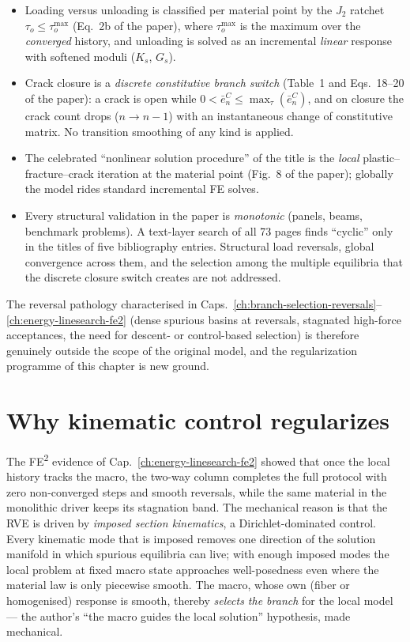\begin{itemize}
  \item Loading versus unloading is classified per material point by
        the $J_2$ ratchet $\tau_o \le \tau_o^{\max}$ (Eq.~2b of the
        paper), where $\tau_o^{\max}$ is the maximum over the
        \emph{converged} history, and unloading is solved as an
        incremental \emph{linear} response with softened moduli
        ($K_s$, $G_s$).
  \item Crack closure is a \emph{discrete constitutive branch switch}
        (Table~1 and Eqs.~18--20 of the paper): a crack is open while
        $0 < \bar e^{C}_n \le \max_{\tau}(\bar e^{C}_n)$, and on
        closure the crack count drops ($n \to n-1$) with an
        instantaneous change of constitutive matrix. No transition
        smoothing of any kind is applied.
  \item The celebrated ``nonlinear solution procedure'' of the title
        is the \emph{local} plastic--fracture--crack iteration at the
        material point (Fig.~8 of the paper); globally the model rides
        standard incremental FE solves.
  \item Every structural validation in the paper is \emph{monotonic}
        (panels, beams, benchmark problems). A text-layer search of all
        73 pages finds ``cyclic'' only in the titles of five
        bibliography entries. Structural load reversals, global
        convergence across them, and the selection among the multiple
        equilibria that the discrete closure switch creates are not
        addressed.
\end{itemize}

The reversal pathology characterised in
Caps.~\ref{ch:branch-selection-reversals}--\ref{ch:energy-linesearch-fe2}
(dense spurious basins at reversals, stagnated high-force acceptances,
the need for descent- or control-based selection) is therefore genuinely
outside the scope of the original model, and the regularization
programme of this chapter is new ground.

\section{Why kinematic control regularizes}
\label{sec:kb-control}

The FE\textsuperscript{2} evidence of
Cap.~\ref{ch:energy-linesearch-fe2} showed that once the local history
tracks the macro, the two-way column completes the full protocol with
zero non-converged steps and smooth reversals, while the same material
in the monolithic driver keeps its stagnation band. The mechanical
reason is that the RVE is driven by \emph{imposed section kinematics},
a Dirichlet-dominated control. Every kinematic mode that is imposed
removes one direction of the solution manifold in which spurious
equilibria can live; with enough imposed modes the local problem at
fixed macro state approaches well-posedness even where the material law
is only piecewise smooth. The macro, whose own (fiber or homogenised)
response is smooth, thereby \emph{selects the branch} for the local
model --- the author's ``the macro guides the local solution''
hypothesis, made mechanical.


